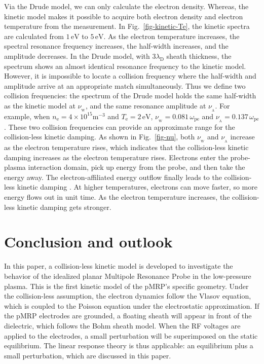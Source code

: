 \documentclass[superscriptaddress,preprint]{revtex4}  %
\begin{document}
Via the Drude model, we can only calculate the electron density. Whereas, the kinetic model makes it possible to acquire both electron density and electron temperature from the measurement. In Fig.~\ref{fig-kinetic-Te}, the kinetic spectra are calculated from $1\,\mathrm{eV}$ to $5\,\mathrm{eV}$. As the electron temperature increases, the spectral resonance frequency increases, the half-width increases, and the amplitude decreases. In the Drude model, with $3\lambda_\mathrm{D}$ sheath thickness, the spectrum shows an almost identical resonance frequency to the kinetic model. However, it is impossible to locate a collision frequency where the half-width and amplitude arrive at an appropriate match simultaneously. Thus we define two collision frequencies: the spectrum of the Drude model holds the same half-width as the kinetic model at $\nu_\mathrm{\!_W}$, and the same resonance amplitude at $\nu_\mathrm{\!_A}$. For example, when $n_\mathrm{e}=4\times10^{15} \mathrm{m}^{-3}$ and $T_\mathrm{e}=2\,\mathrm{eV}$, $\nu_\mathrm{\!_W}=0.081\,\omega_\mathrm{pe}$ and $\nu_\mathrm{\!_A}=0.137\,\omega_\mathrm{pe}$. These two collision frequencies can provide an approximate range for the collision-less kinetic damping. As shown in Fig.~\ref{fig-nu}, both $\nu_\mathrm{\!_W}$ and $\nu_\mathrm{\!_A}$ increase as the electron temperature rises, which indicates that the collision-less kinetic damping increases as the electron temperature rises. Electrons enter the probe-plasma interaction domain, pick up energy from the probe, and then take the energy away. The electron-affiliated energy outflow finally leads to the collision-less kinetic damping \cite{Oberrath2014-1}. At higher temperatures, electrons can move faster, so more energy flows out in unit time. As the electron temperature increases, the collision-less kinetic damping gets stronger.

\pagebreak

\section{Conclusion and outlook}
In this paper, a collision-less kinetic model is developed to investigate the behavior of the idealized planar Multipole Resonance Probe in the low-pressure plasma. This is the first kinetic model of the pMRP's specific geometry. Under the collision-less assumption, the electron dynamics follow the Vlasov equation, which is coupled to the Poisson equation under the electrostatic approximation. If the pMRP electrodes are grounded, a floating sheath will appear in front of the dielectric, which follows the Bohm sheath model. When the RF voltages are applied to the electrodes, a small perturbation will be superimposed on the static equilibrium. The linear response theory is thus applicable: an equilibrium plus a small perturbation, which are discussed in this paper.
\end{document}
